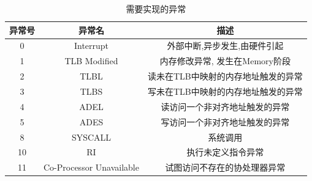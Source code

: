             \begin{table}
            \centering
            \caption{需要实现的异常}
            \begin{tabular}{|c|c|c|}
            \hline
            异常号 & 异常名 & 描述 \\
            \hline
            0 & Interrupt & 外部中断,异步发生,由硬件引起 \\
            \hline
            1 & TLB Modified & 内存修改异常, 发生在Memory阶段 \\
            \hline
            2 & TLBL & 读未在TLB中映射的内存地址触发的异常 \\
            \hline
            3 & TLBS & 写未在TLB中映射的内存地址触发的异常 \\
            \hline
            4 & ADEL　& 读访问一个非对齐地址触发的异常 \\
            \hline
            5 & ADES & 写访问一个非对齐地址触发的异常 \\
            \hline
            8 & SYSCALL & 系统调用 \\
            \hline
            10 & RI & 执行未定义指令异常 \\
            \hline
            11 & Co-Processor Unavailable & 试图访问不存在的协处理器异常 \\
            \hline
            \end{tabular}
            \end{table}

